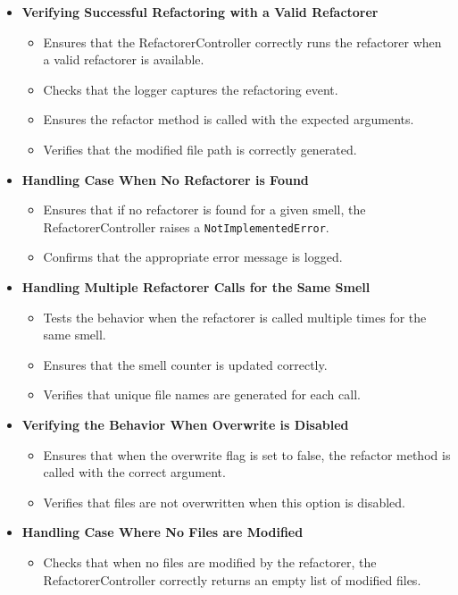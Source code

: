 \documentclass[12pt, titlepage]{article}
\begin{document}
\begin{itemize}
    \item \textbf{Verifying Successful Refactoring with a Valid Refactorer}
    \begin{itemize}
        \item Ensures that the RefactorerController correctly runs the refactorer when a valid refactorer is available.
        \item Checks that the logger captures the refactoring event.
        \item Ensures the refactor method is called with the expected arguments.
        \item Verifies that the modified file path is correctly generated.
    \end{itemize}

    \item \textbf{Handling Case When No Refactorer is Found}
    \begin{itemize}
        \item Ensures that if no refactorer is found for a given smell, the RefactorerController raises a \texttt{NotImplementedError}.
        \item Confirms that the appropriate error message is logged.
    \end{itemize}

    \item \textbf{Handling Multiple Refactorer Calls for the Same Smell}
    \begin{itemize}
        \item Tests the behavior when the refactorer is called multiple times for the same smell.
        \item Ensures that the smell counter is updated correctly.
        \item Verifies that unique file names are generated for each call.
    \end{itemize}

    \item \textbf{Verifying the Behavior When Overwrite is Disabled}
    \begin{itemize}
        \item Ensures that when the overwrite flag is set to false, the refactor method is called with the correct argument.
        \item Verifies that files are not overwritten when this option is disabled.
    \end{itemize}

    \item \textbf{Handling Case Where No Files are Modified}
    \begin{itemize}
        \item Checks that when no files are modified by the refactorer, the RefactorerController correctly returns an empty list of modified files.
    \end{itemize}
\end{itemize}
\end{document}
